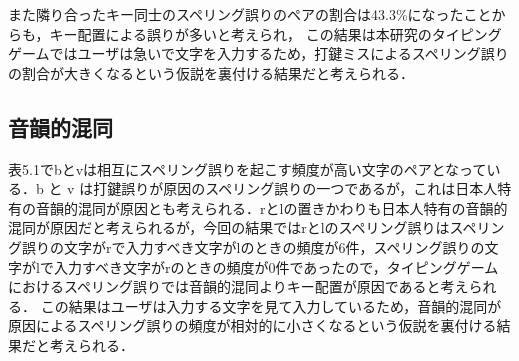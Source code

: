\begin{comment}
表5.1においてのスペリング誤りの文字と入力すべき文字をスペリング誤りのペアとして抽出し，その中で
\end{comment}
また隣り合ったキー同士のスペリング誤りのペアの割合は43.3\%になったことからも，キー配置による誤りが多いと考えられ，
この結果は本研究のタイピングゲームではユーザは急いで文字を入力するため，打鍵ミスによるスペリング誤りの割合が大きくなるという仮説を裏付ける結果だと考えられる．

\begin{comment}
\subsubsection{視覚的混同}
文字同士の形が似ていることから視覚的混同を起こすことが原因であると考えられるスペリング誤りを示す．文字同士の形態的類似度は荒牧ら\cite{aramakiNLP2010}が用いた式に基づいて算出した．式は文字をMSゴシックのフォントで表し，2つの文字の面積の和を分母，2つの文字のフォントを重ね合わせたとき，重なり合った部分の面積の2倍の値を分子としている．式は以下に示す．

\[
  \mbox{文字の類似度} = \frac{\mbox{文字同士の重なり合う部分の面積} \times 2}{\mbox{2つの文字の面積の和}}
\]

表5.3にこの式を用いて求めたsやoと他の文字との類似度を示す．表5.1をみるとsがスペリング誤りになるときの入力すべき文字はcであり，これらの文字は表5.3で示される文字の類似度においても高い値を示している．また表5.3にはpとoについての類似度も示しており，pとoの類似度が互いに高い類似度の値を示している．このことからcとs，pとoのスペリング誤りにおいて視覚的混同が理由の一つになると考えられる．

表5.1においてのスペリング誤りの文字と入力すべき文字をスペリング誤りのペアとして抽出し，その中で表5.3の類似度が0.75以上となるスペリング誤りを抽出したところ，その割合は18.2\%となった．
\end{comment}

\subsection{音韻的混同}
表5.1でbとvは相互にスペリング誤りを起こす頻度が高い文字のペアとなっている．b と v は打鍵誤りが原因のスペリング誤りの一つであるが，これは日本人特有の音韻的混同が原因とも考えられる．rとlの置きかわりも日本人特有の音韻的混同が原因だと考えられるが，今回の結果ではrとlのスペリング誤りはスペリング誤りの文字がrで入力すべき文字がlのときの頻度が6件，スペリング誤りの文字がlで入力すべき文字がrのときの頻度が0件であったので，タイピングゲームにおけるスペリング誤りでは音韻的混同よりキー配置が原因であると考えられる．
この結果はユーザは入力する文字を見て入力しているため，音韻的混同が原因によるスペリング誤りの頻度が相対的に小さくなるという仮説を裏付ける結果だと考えられる．

